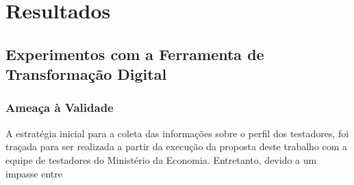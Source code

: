 \chapter{Resultados}
\label{ch:resultados}

\section{Experimentos com a Ferramenta de Transformação Digital}

\subsection{Ameaça à Validade}

A estratégia inicial para a coleta das informações sobre o perfil dos testadores, foi traçada para ser realizada a partir da execução da proposta deste trabalho com a equipe de testadores do Ministério da Economia. Entretanto, devido a um impasse entre 